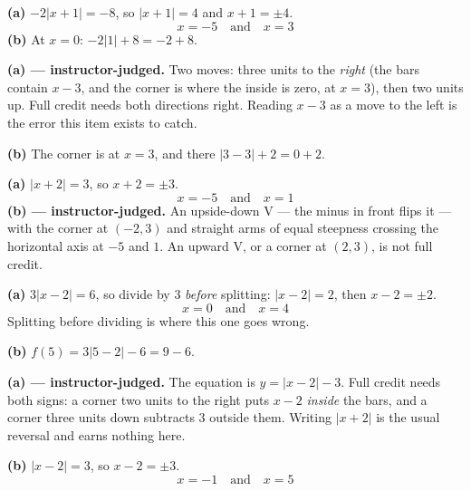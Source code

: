 \documentclass[12pt]{article}
\begin{document}

\textbf{(a)} $-2|x+1| = -8$, so $|x+1| = 4$ and $x + 1 = \pm 4$.
\[ \boxed{x = -5 \quad \text{and} \quad x = 3} \]
\textbf{(b)} At $x = 0$: $-2|1| + 8 = -2 + 8$. 


\textbf{(a) --- instructor-judged.} Two moves: three units to the \emph{right} (the bars contain $x - 3$, and the corner is where the inside is zero, at $x = 3$), then two units up. Full credit needs both directions right. Reading $x - 3$ as a move to the left is the error this item exists to catch.

\textbf{(b)} The corner is at $x = 3$, and there $|3-3| + 2 = 0 + 2$. 


\textbf{(a)} $|x+2| = 3$, so $x + 2 = \pm 3$.
\[ \boxed{x = -5 \quad \text{and} \quad x = 1} \]
\textbf{(b) --- instructor-judged.} An upside-down V --- the minus in front flips it --- with the corner at $(-2, 3)$ and straight arms of equal steepness crossing the horizontal axis at $-5$ and $1$. An upward V, or a corner at $(2,3)$, is not full credit.


\textbf{(a)} $3|x-2| = 6$, so divide by $3$ \emph{before} splitting: $|x-2| = 2$, then $x - 2 = \pm 2$.
\[ \boxed{x = 0 \quad \text{and} \quad x = 4} \]
Splitting before dividing is where this one goes wrong.

\textbf{(b)} $f(5) = 3|5-2| - 6 = 9 - 6$. 


\textbf{(a) --- instructor-judged.} The equation is $y = |x-2| - 3$. Full credit needs both signs: a corner two units to the right puts $x - 2$ \emph{inside} the bars, and a corner three units down subtracts $3$ outside them. Writing $|x+2|$ is the usual reversal and earns nothing here.

\textbf{(b)} $|x-2| = 3$, so $x - 2 = \pm 3$.
\[ \boxed{x = -1 \quad \text{and} \quad x = 5} \]

\end{document}
